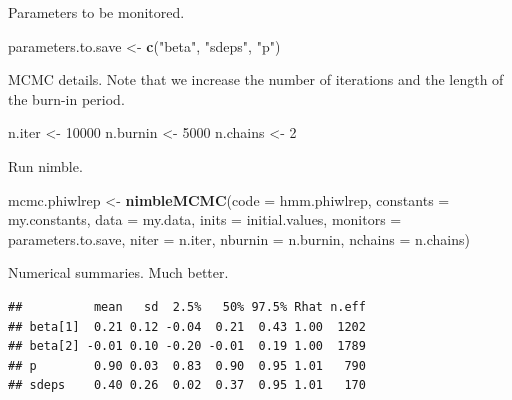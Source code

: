 \documentclass[
  12pt,
]{krantz}
\newenvironment{Shaded}{\begin{snugshade}}{\end{snugshade}}
\newcommand{\AttributeTok}[1]{\textcolor[rgb]{0.13,0.29,0.53}{#1}}
\newcommand{\DecValTok}[1]{\textcolor[rgb]{0.00,0.00,0.81}{#1}}
\newcommand{\FunctionTok}[1]{\textcolor[rgb]{0.13,0.29,0.53}{\textbf{#1}}}
\newcommand{\NormalTok}[1]{#1}
\newcommand{\OtherTok}[1]{\textcolor[rgb]{0.56,0.35,0.01}{#1}}
\newcommand{\StringTok}[1]{\textcolor[rgb]{0.31,0.60,0.02}{#1}}
\begin{document}
Parameters to be monitored.

\begin{Shaded}
\begin{Highlighting}[]
\NormalTok{parameters.to.save }\OtherTok{\textless{}{-}} \FunctionTok{c}\NormalTok{(}\StringTok{"beta"}\NormalTok{, }\StringTok{"sdeps"}\NormalTok{, }\StringTok{"p"}\NormalTok{)}
\end{Highlighting}
\end{Shaded}

MCMC details. Note that we increase the number of iterations and the length of the burn-in period.

\begin{Shaded}
\begin{Highlighting}[]
\NormalTok{n.iter }\OtherTok{\textless{}{-}} \DecValTok{10000}
\NormalTok{n.burnin }\OtherTok{\textless{}{-}} \DecValTok{5000}
\NormalTok{n.chains }\OtherTok{\textless{}{-}} \DecValTok{2}
\end{Highlighting}
\end{Shaded}

Run nimble.

\begin{Shaded}
\begin{Highlighting}[]
\NormalTok{mcmc.phiwlrep }\OtherTok{\textless{}{-}} \FunctionTok{nimbleMCMC}\NormalTok{(}\AttributeTok{code =}\NormalTok{ hmm.phiwlrep, }
                            \AttributeTok{constants =}\NormalTok{ my.constants,}
                            \AttributeTok{data =}\NormalTok{ my.data,              }
                            \AttributeTok{inits =}\NormalTok{ initial.values,}
                            \AttributeTok{monitors =}\NormalTok{ parameters.to.save,}
                            \AttributeTok{niter =}\NormalTok{ n.iter,}
                            \AttributeTok{nburnin =}\NormalTok{ n.burnin, }
                            \AttributeTok{nchains =}\NormalTok{ n.chains)}
\end{Highlighting}
\end{Shaded}

Numerical summaries. Much better.

\begin{verbatim}
##          mean   sd  2.5%   50% 97.5% Rhat n.eff
## beta[1]  0.21 0.12 -0.04  0.21  0.43 1.00  1202
## beta[2] -0.01 0.10 -0.20 -0.01  0.19 1.00  1789
## p        0.90 0.03  0.83  0.90  0.95 1.01   790
## sdeps    0.40 0.26  0.02  0.37  0.95 1.01   170
\end{verbatim}
\end{document}
